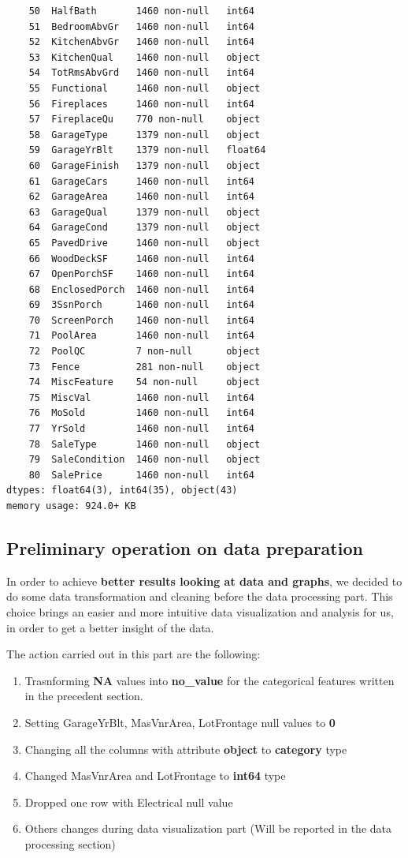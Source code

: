 \begin{lstlisting}
    50  HalfBath       1460 non-null   int64  
    51  BedroomAbvGr   1460 non-null   int64  
    52  KitchenAbvGr   1460 non-null   int64  
    53  KitchenQual    1460 non-null   object 
    54  TotRmsAbvGrd   1460 non-null   int64  
    55  Functional     1460 non-null   object 
    56  Fireplaces     1460 non-null   int64  
    57  FireplaceQu    770 non-null    object 
    58  GarageType     1379 non-null   object 
    59  GarageYrBlt    1379 non-null   float64
    60  GarageFinish   1379 non-null   object 
    61  GarageCars     1460 non-null   int64  
    62  GarageArea     1460 non-null   int64  
    63  GarageQual     1379 non-null   object 
    64  GarageCond     1379 non-null   object 
    65  PavedDrive     1460 non-null   object 
    66  WoodDeckSF     1460 non-null   int64  
    67  OpenPorchSF    1460 non-null   int64  
    68  EnclosedPorch  1460 non-null   int64  
    69  3SsnPorch      1460 non-null   int64  
    70  ScreenPorch    1460 non-null   int64  
    71  PoolArea       1460 non-null   int64  
    72  PoolQC         7 non-null      object 
    73  Fence          281 non-null    object 
    74  MiscFeature    54 non-null     object 
    75  MiscVal        1460 non-null   int64  
    76  MoSold         1460 non-null   int64  
    77  YrSold         1460 non-null   int64  
    78  SaleType       1460 non-null   object 
    79  SaleCondition  1460 non-null   object 
    80  SalePrice      1460 non-null   int64  
dtypes: float64(3), int64(35), object(43)
memory usage: 924.0+ KB
\end{lstlisting}

\subsection{Preliminary operation on data preparation}
\label{sec:preliminary_operation_on_data_preparation}

In order to achieve \textbf{better results looking at data and graphs}, we decided to
do some data transformation and cleaning before the data processing part. This choice brings 
an easier and more intuitive data visualization and analysis for us, in order to get a better
insight of the data. 

The action carried out in this part are the following:
\begin{enumerate}
    \item Trasnforming \textbf{NA} values into \textbf{no\_value} for the categorical features written in the precedent section.
    \item Setting GarageYrBlt, MasVnrArea, LotFrontage null values to \textbf{0}
    \item Changing all the columns with attribute \textbf{object} to \textbf{category} type
    \item Changed MasVnrArea and LotFrontage to \textbf{int64} type
    \item Dropped one row with Electrical null value
    \item Others changes during data visualization part (Will be reported in the data processing section)   
\end{enumerate}

